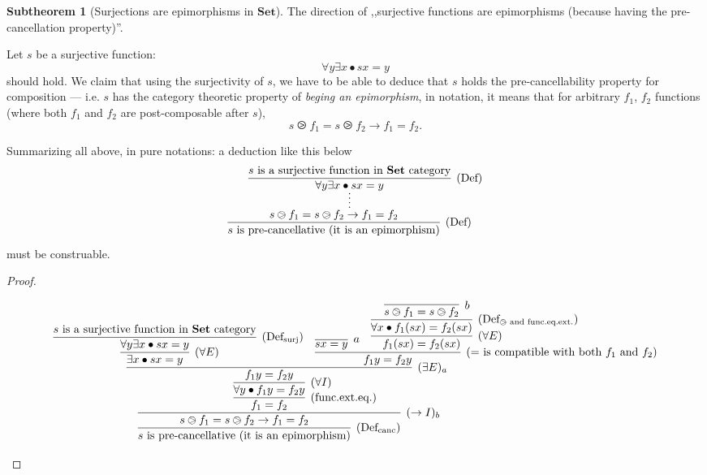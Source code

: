 \documentclass{article}
\newcommand{\setCat}{\mathbf{Set}}
\theoremstyle{definition}
\newtheorem{sth}{Subtheorem}[thm]
\begin{document}
	\begin{sth}[Surjections are epimorphisms in $\setCat$]
		The direction of ,,surjective functions are epimorphisms (because having the pre-cancellation property)''.

		Let $s$ be a surjective function:\[\forall y \exists x \bullet sx = y\]should hold.
		We claim that using the surjectivity of $s$, we have to be able to deduce that $s$ holds the pre-cancellability property for composition --- i.e. $s$ has the category theoretic property of \emph{beging an epimorphism}, in notation, it means that for arbitrary $f_1$, $f_2$ functions (where both $f_1$ and $f_2$ are post-composable after $s$),
		\[s\ogreaterthan f_1 = s\ogreaterthan f_2 \to f_1 = f_2.\]

		Summarizing all above, in pure notations: a deduction like this below
		\[
			\infer*{
				\infer[(\text{Def})]{
					\text{$s$ is pre-cancellative (it is an epimorphism)}
				}{
					s\ogreaterthan f_1 = s\ogreaterthan f_2 \to f_1 = f_2
				}
			}{
				\infer[(\text{Def})]{
					\forall y \exists x \bullet sx = y
				}{
					\text{$s$ is a surjective function in $\setCat$ category}
				}
			}
		\]
		must be construable.
	\end{sth}
	\begin{proof}
		\begin{adjustwidth}{-100pt}{0pt}
			\[
				\infer[(\to I)_b]{
					\infer[(\text{Def}_{\text{canc}})]{
						\text{$s$ is pre-cancellative (it is an epimorphism)}
					}{
						s\ogreaterthan f_1 = s\ogreaterthan f_2 \to f_1 = f_2
					}
				}{
					\infer[(\text{func.ext.eq.})]{
						f_1 = f_2
					}{
						\infer[(\forall I)]{
							\forall y \bullet f_1 y = f_2 y
						}{
							\infer[(\exists E)_a]{
								f_1 y = f_2 y
							}{
								\infer[(\forall E)]{
									\exists x \bullet sx = y
								}{
									\infer[(\text{Def}_{\text{surj}})]{
										\forall y \exists x \bullet sx = y
									}{
										\text{$s$ is a surjective function in $\setCat$ category}
									}
								}
								&
								\infer[(\text{$=$ is compatible with both $f_1$ and $f_2$})]{
									f_1 y = f_2 y
								}{
									\infer[a]{sx = y}{}
									&
									\infer[(\forall E)]{
										f_1(sx) = f_2(sx)
									}{
										\infer[(\text{Def}_{\text{$\ogreaterthan$ and func.eq.ext.}})]{
											\forall x \bullet f_1(sx) = f_2(sx)
										}{
											\infer[b]{
												s\ogreaterthan f_1 = s\ogreaterthan f_2
											}{}
										}
									}
								}
							}
						}
					}
				}
			\]
		\end{adjustwidth}
	\end{proof}
\end{document}
